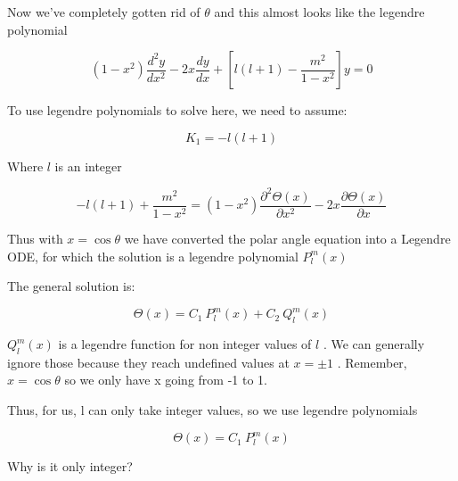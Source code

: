 \documentclass[12pt]{article}
\renewcommand{\_}{\kern-1.5pt\textunderscore\kern-1.5pt}
\begin{document}
\vspace{\baselineskip}
Now we’ve completely gotten rid of  \(  \theta  \)  and this almost looks like the legendre polynomial\par

 \[  \left( 1-x^{2} \right) \frac{d^{2}y}{dx^{2}}-2x\frac{dy}{dx}+ \left[ l \left( l+1 \right) -\frac{m^{2}}{1-x^{2}} \right] y=0 \] \par

To use legendre polynomials to solve here, we need to assume:\par

 \[ K_{1}=-l \left( l+1 \right)  \] \par

Where  \( l \)  is an integer\par

 \[ -l \left( l+1 \right) +\frac{m^{2}}{1-x^{2}}= \left( 1-x^{2} \right) \frac{ \partial ^{2} \Theta  \left( x \right) }{ \partial x^{2}}-2x\frac{ \partial  \Theta  \left( x \right) }{ \partial x} \] \par

Thus with  \( x=\cos  \theta  \)  we have converted the polar angle equation into a Legendre ODE, for which the solution is a legendre polynomial  \( P_{l}^{m} \left( x \right)  \) \par

The general solution is:\par

 \[  \Theta  \left( x \right) =C_{1}~P_{l}^{m} \left( x \right) +C_{2}~Q_{l}^{m} \left( x \right)  \] \par

 \( Q_{l}^{m} \left( x \right)  \)  is a legendre function for non integer values of  \( l \) . We can generally ignore those because they reach undefined values at  \( x= \pm 1 \) . Remember,  \( x=\cos  \theta  \)  so we only have x going from -1 to 1. \par

Thus, for us, l can only take integer values, so we use legendre polynomials \par

 \[  \Theta  \left( x \right) =C_{1}~P_{l}^{m} \left( x \right)  \] \par

Why is it only integer?\par


\printbibliography
\end{document}
